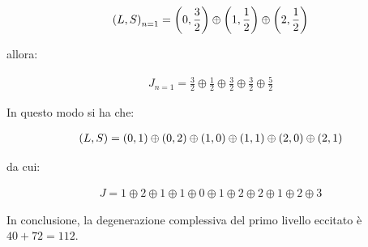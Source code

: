 \begin{itemize}
\begin{enumerate}
\begin{itemize}
		\begin{align*}
			\qty(L, S)_{n = 1} = \qty(0, \frac{3}{2}) \oplus \qty(1, \frac{1}{2}) \oplus \qty(2, \frac{1}{2})
		\end{align*}
		
			allora:
			
		\begin{align*}
			J_{n = 1} = \frac{3}{2} \oplus \frac{1}{2} \oplus \frac{3}{2} \oplus \frac{3}{2} \oplus \frac{5}{2}
		\end{align*}

		\end{itemize}
	
		In questo modo si ha che:
		
	\begin{align*}
		\qty(L, S) = \qty(0, 1) \oplus \qty(0, 2) \oplus \qty(1, 0) \oplus \qty(1, 1) \oplus \qty(2, 0) \oplus \qty(2, 1)
	\end{align*}
	
	
		da cui:
		
	\begin{align*}
		J = 1 \oplus 2 \oplus 1 \oplus 1 \oplus 0 \oplus 1 \oplus 2 \oplus 2 \oplus 1 \oplus 2 \oplus 3
	\end{align*}
		
	\end{enumerate}

\end{itemize}
	
	In conclusione, la degenerazione complessiva del primo livello eccitato è $40 + 72 = 112$.
	
	
	
	
	
	
	
	
	
	
	
